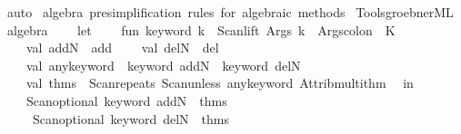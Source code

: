 \begin{isabellebody}
%
\isatagproof
{}\isamarkupfalse%
\ auto%
\endisatagproof
{\isafoldproof}%
%
\isadelimproof
\isanewline
%
\endisadelimproof
\isanewline
{}\isamarkupfalse%
\ algebra\ {\isachardoublequoteopen}pre{\isacharminus}{\kern0pt}simplification\ rules\ for\ algebraic\ methods{\isachardoublequoteclose}\isanewline
%
\isadelimML
%
\endisadelimML
%
\isatagML
{}\isamarkupfalse%
\ {\isacartoucheopen}Tools{\isacharslash}{\kern0pt}groebner{\isachardot}{\kern0pt}ML{\isacartoucheclose}\isanewline
\isanewline
{}\isamarkupfalse%
\ algebra\ {\isacharequal}{\kern0pt}\ {\isacartoucheopen}\isanewline
\ \ let\isanewline
\ \ \ \ fun\ keyword\ k\ {\isacharequal}{\kern0pt}\ Scan{\isachardot}{\kern0pt}lift\ {\isacharparenleft}{\kern0pt}Args{\isachardot}{\kern0pt}{\isachardollar}{\kern0pt}{\isachardollar}{\kern0pt}{\isachardollar}{\kern0pt}\ k\ {\isacharminus}{\kern0pt}{\isacharminus}{\kern0pt}\ Args{\isachardot}{\kern0pt}colon{\isacharparenright}{\kern0pt}\ {\isachargreater}{\kern0pt}{\isachargreater}{\kern0pt}\ K\ {\isacharparenleft}{\kern0pt}{\isacharparenright}{\kern0pt}\isanewline
\ \ \ \ val\ addN\ {\isacharequal}{\kern0pt}\ {\isachardoublequote}{\kern0pt}add{\isachardoublequote}{\kern0pt}\isanewline
\ \ \ \ val\ delN\ {\isacharequal}{\kern0pt}\ {\isachardoublequote}{\kern0pt}del{\isachardoublequote}{\kern0pt}\isanewline
\ \ \ \ val\ any{\isacharunderscore}{\kern0pt}keyword\ {\isacharequal}{\kern0pt}\ keyword\ addN\ {\isacharbar}{\kern0pt}{\isacharbar}{\kern0pt}\ keyword\ delN\isanewline
\ \ \ \ val\ thms\ {\isacharequal}{\kern0pt}\ Scan{\isachardot}{\kern0pt}repeats\ {\isacharparenleft}{\kern0pt}Scan{\isachardot}{\kern0pt}unless\ any{\isacharunderscore}{\kern0pt}keyword\ Attrib{\isachardot}{\kern0pt}multi{\isacharunderscore}{\kern0pt}thm{\isacharparenright}{\kern0pt}{\isacharsemicolon}{\kern0pt}\isanewline
\ \ in\isanewline
\ \ \ \ Scan{\isachardot}{\kern0pt}optional\ {\isacharparenleft}{\kern0pt}keyword\ addN\ {\isacharbar}{\kern0pt}{\isacharminus}{\kern0pt}{\isacharminus}{\kern0pt}\ thms{\isacharparenright}{\kern0pt}\ {\isacharbrackleft}{\kern0pt}{\isacharbrackright}{\kern0pt}\ {\isacharminus}{\kern0pt}{\isacharminus}{\kern0pt}\isanewline
\ \ \ \ \ Scan{\isachardot}{\kern0pt}optional\ {\isacharparenleft}{\kern0pt}keyword\ delN\ {\isacharbar}{\kern0pt}{\isacharminus}{\kern0pt}{\isacharminus}{\kern0pt}\ thms{\isacharparenright}{\kern0pt}\ {\isacharbrackleft}{\kern0pt}{\isacharbrackright}{\kern0pt}\ {\isachargreater}{\kern0pt}{\isachargreater}{\kern0pt}\isanewline

\end{isabellebody}
